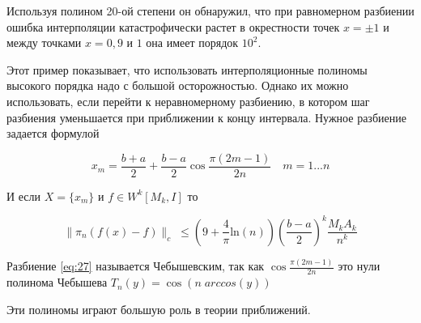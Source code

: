 Используя полином 20-ой степени он обнаружил, что при равномерном разбиении ошибка интерполяции катастрофически растет в окрестности точек $x = \pm 1$ и между точками $x = 0,9$ и $1$ она имеет порядок $10^2$.

Этот пример показывает, что использовать интерполяционные полиномы высокого порядка надо с большой осторожностью. Однако их можно использовать, если перейти к неравномерному разбиению, в котором шаг разбиения уменьшается при приближении к концу интервала.
Нужное разбиение задается формулой 

\begin{equation}\label{eq:27}
x_m = \frac{b+a}{2} + \frac{b-a}{2} \cos \frac{\pi(2m-1)}{2n} \quad m = 1...n
\end{equation}

И если $X = \{x_m\}$ и $f \in W^k[M_k, I]$ то 

\begin{equation}
\parallel \pi_n (f(x) -f) \parallel_c \; \leq \left(
9+ \frac{4}{\pi}\mathrm{ln} (n)\right) \left( \frac{b-a}{2}\right)^k \frac{M_kA_k}{n^k}
\end{equation}

Разбиение \ref{eq:27} называется Чебышевским, так как $\cos \frac{\pi(2m-1)}{2n}$ это нули полинома Чебышева $T_n(y) = \cos(n \; arccos(y))$

Эти полиномы играют большую роль в теории приближений.




